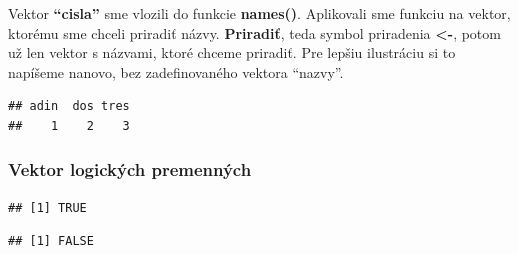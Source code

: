 Vektor \textbf{``cisla''} sme vlozili do funkcie \textbf{names()}.
Aplikovali sme funkciu na vektor, ktorému sme chceli priradiť názvy.
\textbf{Priradiť}, teda symbol priradenia \textbf{\textless-}, potom už
len vektor s názvami, ktoré chceme priradiť. Pre lepšiu ilustráciu si to
napíšeme nanovo, bez zadefinovaného vektora ``nazvy''.

\begin{Shaded}
\begin{Highlighting}[]
\StringTok{ }\NormalTok{(}\NormalTok{, }\NormalTok{, }\NormalTok{)}

\end{Highlighting}
\end{Shaded}

\begin{verbatim}
## adin  dos tres 
##    1    2    3
\end{verbatim}

\hypertarget{vektor-logickuxfdch-premennuxfdch}{%
\subsubsection{Vektor logických
premenných}\label{vektor-logickuxfdch-premennuxfdch}}

\begin{Shaded}
\begin{Highlighting}[]
\StringTok{  }
\OperatorTok{==}\StringTok{ }
\end{Highlighting}
\end{Shaded}
\begin{verbatim}
## [1] TRUE
\end{verbatim}

\begin{Shaded}
\begin{Highlighting}[]
\OperatorTok{==}\StringTok{ }
\end{Highlighting}
\end{Shaded}

\begin{verbatim}
## [1] FALSE
\end{verbatim}

